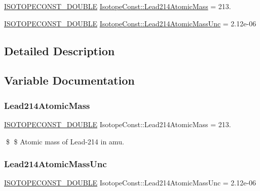 \begin{DoxyCompactItemize}
\item 
\mbox{\hyperlink{group___isotope_const-_macros_ga8f45a7272ce02c0b4c65c44636ed719a}{I\+S\+O\+T\+O\+P\+E\+C\+O\+N\+S\+T\+\_\+\+D\+O\+U\+B\+LE}} \mbox{\hyperlink{group___isotope_const-_lead-_pb214_gac4540d044df96c5fe1dabb7202ade9bf}{Isotope\+Const\+::\+Lead214\+Atomic\+Mass}} = 213.
\item 
\mbox{\hyperlink{group___isotope_const-_macros_ga8f45a7272ce02c0b4c65c44636ed719a}{I\+S\+O\+T\+O\+P\+E\+C\+O\+N\+S\+T\+\_\+\+D\+O\+U\+B\+LE}} \mbox{\hyperlink{group___isotope_const-_lead-_pb214_ga5b3d283e11ce44bd32fcc30e91a60ff9}{Isotope\+Const\+::\+Lead214\+Atomic\+Mass\+Unc}} = 2.\+12e-\/06
\end{DoxyCompactItemize}


\subsection{Detailed Description}


\subsection{Variable Documentation}
\mbox{\label{group___isotope_const-_lead-_pb214_gac4540d044df96c5fe1dabb7202ade9bf}} 
\subsubsection{\texorpdfstring{Lead214\+Atomic\+Mass}{Lead214AtomicMass}}
{\footnotesize\ttfamily \mbox{\hyperlink{group___isotope_const-_macros_ga8f45a7272ce02c0b4c65c44636ed719a}{I\+S\+O\+T\+O\+P\+E\+C\+O\+N\+S\+T\+\_\+\+D\+O\+U\+B\+LE}} Isotope\+Const\+::\+Lead214\+Atomic\+Mass = 213.}

\$ \$ Atomic mass of Lead-\/214 in amu. \mbox{\label{group___isotope_const-_lead-_pb214_ga5b3d283e11ce44bd32fcc30e91a60ff9}} 
\subsubsection{\texorpdfstring{Lead214\+Atomic\+Mass\+Unc}{Lead214AtomicMassUnc}}
{\footnotesize\ttfamily \mbox{\hyperlink{group___isotope_const-_macros_ga8f45a7272ce02c0b4c65c44636ed719a}{I\+S\+O\+T\+O\+P\+E\+C\+O\+N\+S\+T\+\_\+\+D\+O\+U\+B\+LE}} Isotope\+Const\+::\+Lead214\+Atomic\+Mass\+Unc = 2.\+12e-\/06}

